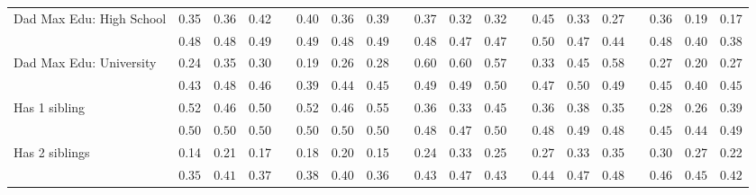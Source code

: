 \begin{center}
{\begin{longtable}{L{6cm} c c c p{.5cm} c c c p{.5cm} c c c p{.5cm} c c c p{.5cm} c c c}
 \quad Dad Max Edu: High School & 0.35 &      0.36 &      0.42 & &      0.40 &      0.36 &      0.39 & &      0.37 &      0.32 &      0.32 & &      0.45 &      0.33 &      0.27 & &      0.36 &      0.19 &      0.17 \\*
 \quad & $\mathit{     0.48}$ & $\mathit{     0.48}$ & $\mathit{     0.49}$ & & $\mathit{     0.49}$ & $\mathit{     0.48}$ & $\mathit{     0.49}$ & & $\mathit{     0.48}$ & $\mathit{     0.47}$ & $\mathit{     0.47}$ & & $\mathit{     0.50}$ & $\mathit{     0.47}$ & $\mathit{     0.44}$ & & $\mathit{     0.48}$ & $\mathit{     0.40}$ & $\mathit{     0.38}$ \\[.2em]
 \quad Dad Max Edu: University & 0.24 &      0.35 &      0.30 & &      0.19 &      0.26 &      0.28 & &      0.60 &      0.60 &      0.57 & &      0.33 &      0.45 &      0.58 & &      0.27 &      0.20 &      0.27 \\*
 \quad & $\mathit{     0.43}$ & $\mathit{     0.48}$ & $\mathit{     0.46}$ & & $\mathit{     0.39}$ & $\mathit{     0.44}$ & $\mathit{     0.45}$ & & $\mathit{     0.49}$ & $\mathit{     0.49}$ & $\mathit{     0.50}$ & & $\mathit{     0.47}$ & $\mathit{     0.50}$ & $\mathit{     0.49}$ & & $\mathit{     0.45}$ & $\mathit{     0.40}$ & $\mathit{     0.45}$ \\[.2em]
 \quad Has 1 sibling & 0.52 &      0.46 &      0.50 & &      0.52 &      0.46 &      0.55 & &      0.36 &      0.33 &      0.45 & &      0.36 &      0.38 &      0.35 & &      0.28 &      0.26 &      0.39 \\*
 \quad & $\mathit{     0.50}$ & $\mathit{     0.50}$ & $\mathit{     0.50}$ & & $\mathit{     0.50}$ & $\mathit{     0.50}$ & $\mathit{     0.50}$ & & $\mathit{     0.48}$ & $\mathit{     0.47}$ & $\mathit{     0.50}$ & & $\mathit{     0.48}$ & $\mathit{     0.49}$ & $\mathit{     0.48}$ & & $\mathit{     0.45}$ & $\mathit{     0.44}$ & $\mathit{     0.49}$ \\[.2em]
 \quad Has 2 siblings & 0.14 &      0.21 &      0.17 & &      0.18 &      0.20 &      0.15 & &      0.24 &      0.33 &      0.25 & &      0.27 &      0.33 &      0.35 & &      0.30 &      0.27 &      0.22 \\*
 \quad & $\mathit{     0.35}$ & $\mathit{     0.41}$ & $\mathit{     0.37}$ & & $\mathit{     0.38}$ & $\mathit{     0.40}$ & $\mathit{     0.36}$ & & $\mathit{     0.43}$ & $\mathit{     0.47}$ & $\mathit{     0.43}$ & & $\mathit{     0.44}$ & $\mathit{     0.47}$ & $\mathit{     0.48}$ & & $\mathit{     0.46}$ & $\mathit{     0.45}$ & $\mathit{     0.42}$ \\[.2em]

\end{longtable}}
\end{center}
